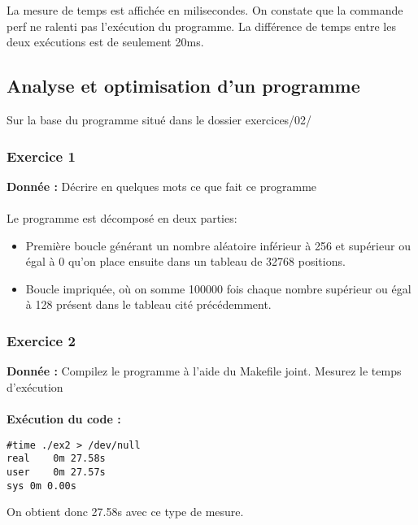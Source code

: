La mesure de temps est affichée en milisecondes. On constate que la commande perf ne ralenti pas l'exécution du programme. La différence de temps entre les deux exécutions est de seulement 20ms.

\subsection{Analyse et optimisation d'un programme}
Sur	la	base	du	programme	situé	dans	le	dossier	exercices/02/
\subsubsection{Exercice 1}
\textbf{Donnée : } Décrire	en	quelques	mots	ce	que	fait	ce	programme\\\\
Le programme est décomposé en deux parties:
\begin{itemize}
\item Première boucle générant un nombre aléatoire inférieur à 256 et supérieur ou égal à 0 qu'on place ensuite dans un tableau de 32768 positions.
\item Boucle impriquée, où on somme 100000 fois chaque nombre supérieur ou égal à 128 présent dans le tableau cité précédemment.
\end{itemize}
\subsubsection{Exercice 2}
\textbf{Donnée : } Compilez	le	programme	à	l'aide	du	Makefile	joint.
Mesurez	le	temps	d'exécution\\\\

\textbf{Exécution du code : } \\
\begin{lstlisting}
#time ./ex2 > /dev/null
real    0m 27.58s
user    0m 27.57s
sys 0m 0.00s
\end{lstlisting}
On obtient donc 27.58s avec ce type de mesure.
